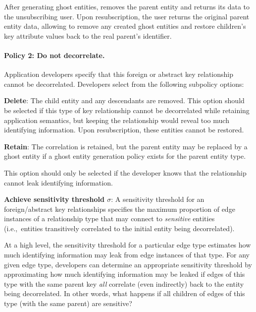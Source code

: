 %

After generating ghost entities, \sys removes the parent entity and returns its data to the unsubscribing user. 
Upon resubscription, the user returns the original parent entity data, allowing \sys to remove any created
ghost entities and restore children's key attribute values back to the real parent's identifier.

%
\paragraph{Policy 2: Do not decorrelate.}
Application developers specify that this foreign or abstract key relationship cannot be decorrelated.
Developers select from the following subpolicy options: 
    
    \textbf{Delete}: The child entity and any descendants are removed. This option should be
        selected if this type of key relationship cannot be decorrelated while retaining application
        semantics, but keeping the relationship would reveal too much identifying information.
        Upon resubscription, these entities cannot be restored.

    \textbf{Retain}: The correlation is retained, but the parent entity may be replaced by a ghost
    entity if a ghost entity generation policy exists for the parent entity type.

        This option should only be selected if the developer knows that the
        relationship cannot leak identifying information.

    \textbf{Achieve sensitivity threshold $\sigma$}:
        A sensitivity threshold for an foreign/abstract key relationships specifies the maximum
        proportion of edge instances of a relationship type that may connect to \emph{sensitive}
        entities (i.e.,\ entities transitively correlated to the initial entity being decorrelated). 

        At a high level, the sensitivity threshold for a particular edge type estimates how much identifying
        information may leak from edge instances of that type.  For any given edge type, developers can
        determine an appropriate sensitivity threshold by approximating how much identifying information
        may be leaked if edges of this type with the same parent key \emph{all} correlate (even indirectly)
        back to the entity being decorrelated. In other words, what happens if all children of edges of this
        type (with the same parent) are sensitive?

